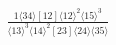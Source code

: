 \documentclass[varwidth, border=5pt]{standalone}
\begin{document}
\begin{my}
$\begin{gathered}
\scriptscriptstyle\frac{1⟨34⟩[12]⟨12⟩^2⟨15⟩^3}{⟨13⟩^3⟨14⟩^2[23]⟨24⟩⟨35⟩}
\end{gathered}$
\end{my}
\end{document}

